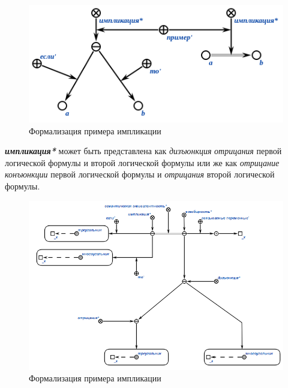 \begin{figure}[http]
\includegraphics[scale=0.8]{author/part2/figures/logic/implication.png}
\caption{Формализация примера импликации}
\label{fig:implication}
\end{figure}

\textbf{\textit{импликация*}} может быть представлена как \textit{дизъюнкция} \textit{отрицания} первой логической формулы и второй логической формулы или же как \textit{отрицание} \textit{конъюнкции} первой логической формулы и \textit{отрицания} второй логической формулы.

\begin{figure}[http]
	\includegraphics[scale=0.8]{author/part2/figures/logic/implication_representation.png}
	\caption{Формализация примера импликации}
	\label{fig:implication_representation}
\end{figure}

